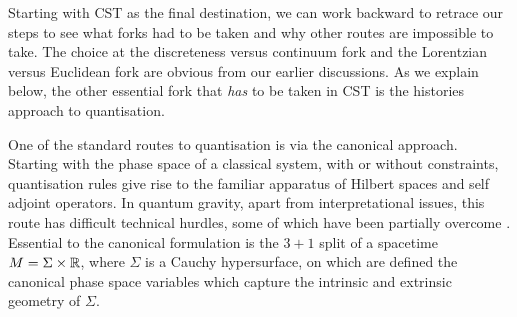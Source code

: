 Starting with CST as the final destination, we can work backward to retrace our steps to see what forks had
to be taken and why other routes are impossible to take. The choice  at the discreteness versus continuum fork and the
Lorentzian versus Euclidean fork are obvious from our earlier discussions. As we  explain below, the other essential fork that \emph{has} to be taken
in CST is the histories approach to quantisation.

One of the standard routes to quantisation is via  the canonical approach.  Starting with the phase space of a
classical system, with or without constraints,  quantisation rules  give rise to the 
familiar apparatus of Hilbert spaces and self adjoint operators.   In quantum gravity,  apart
from interpretational issues, this route has difficult technical hurdles, some of which have been partially
overcome \citep{ashtekar}. Essential to the canonical formulation is the $3+1$ split of a spacetime $M=\Sigma \times \mathbb R$,
where $\Sigma$ is a Cauchy hypersurface, on which are defined the canonical phase space variables which capture the intrinsic and
extrinsic geometry of $\Sigma$. 

